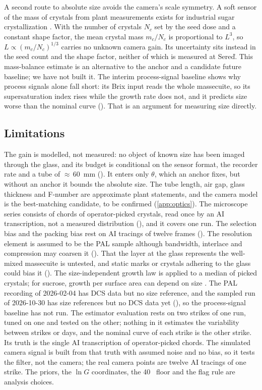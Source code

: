 A second route to absolute size avoids the camera's scale symmetry. A soft sensor of the mass of crystals from plant
measurements exists for industrial sugar crystallization \citep{Damour2010}. With the number of crystals $N_c$ set by
the seed dose and a constant shape factor, the mean crystal mass $m_c/N_c$ is proportional to $L^3$, so
$L \propto (m_c/N_c)^{1/3}$ carries no unknown camera gain. Its uncertainty sits instead in the seed count and the
shape factor, neither of which is measured at Sere\v{d}. This mass-balance estimate is an alternative to the anchor
and a candidate future baseline; we have not built it. The interim process-signal baseline shows why process
signals alone fall short: its Brix input reads the whole massecuite, so its supersaturation index rises while the
growth rate does not, and it predicts size worse than the nominal curve (). That is an
argument for measuring size directly.

\subsection{Limitations}\label{sec:notperform}

The gain is modelled, not measured: no object of known size has been imaged through the glass, and its budget is
conditional on the sensor format, the recorder rate and a tube of ${\approx}\,60$~mm (). It enters
only $\theta$, which an anchor fixes, but without an anchor it bounds the absolute size. The tube length, air gap,
glass thickness and F-number are approximate plant statements, and the camera model is the best-matching candidate,
to be confirmed (\ref{app:optics}). The microscope series consists of chords of operator-picked crystals, read once
by an AI transcription, not a measured distribution (), and it covers one run. The selection
bias and the packing bias rest on AI tracings of twelve frames (). The resolution element is assumed
to be the PAL sample although bandwidth, interlace and compression may coarsen it (). That the layer
at the glass represents the well-mixed massecuite is untested, and static marks or crystals adhering to the glass could
bias it (). The size-independent growth law is applied to a median of picked crystals; for sucrose,
growth per surface area can depend on size \citep{Martins2007}. The PAL recording of 2026-02-04 has DCS data but no
size reference, and the sampled run of 2026-10-30 has size references but no DCS data yet (),
so the process-signal baseline has not run. The estimator evaluation rests on two strikes of one run, tuned on one and
tested on the other; nothing in it estimates the variability between strikes or days, and the nominal curve of each
strike is the other strike. Its truth is the single AI transcription of operator-picked chords. The simulated camera
signal is built from that truth with assumed noise and no bias, so it tests the filter, not the camera; the real
camera points are twelve AI tracings of one strike. The priors, the $\ln G$ coordinates, the 40~\um{} floor and the
flag rule are analysis choices.

